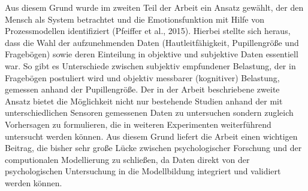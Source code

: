 Aus diesem Grund wurde im zweiten Teil der Arbeit ein Ansatz gewählt, der den Mensch als System
betrachtet und die Emotionsfunktion mit Hilfe von Prozessmodellen identifiziert (Pfeiffer et al., 2015).
Hierbei stellte sich heraus, dass die Wahl der aufzunehmenden Daten (Hautleitfähigkeit, Pupillengröße
und Fragebögen) sowie deren Einteilung in objektive und subjektive Daten essentiell war. So gibt es
Unterschiede zwischen subjektiv empfundener Belastung, der in Fragebögen postuliert wird und
objektiv messbarer (kognitiver) Belastung, gemessen anhand der Pupillengröße.
Der in der Arbeit beschriebene zweite Ansatz bietet die Möglichkeit nicht nur bestehende Studien
anhand der mit unterschiedlichen Sensoren gemessenen Daten zu untersuchen sondern zugleich
Vorhersagen zu formulieren, die in weiteren Experimenten weiterführend untersucht werden können.
Aus diesem Grund liefert die Arbeit einen wichtigen Beitrag, die bisher sehr große Lücke zwischen
psychologischer Forschung und der computionalen Modellierung zu schließen, da Daten direkt von der
psychologischen Untersuchung in die Modellbildung integriert und validiert werden können.

